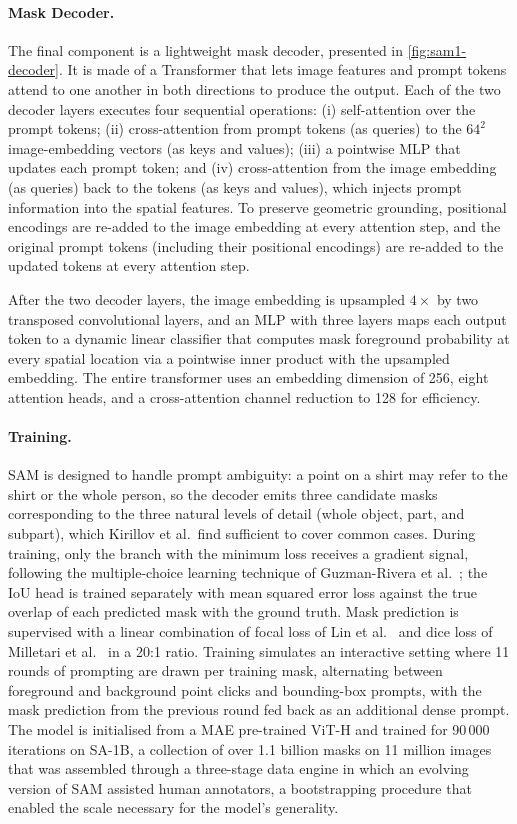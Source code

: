 \paragraph{Mask Decoder.} The final component is a lightweight mask decoder, presented in \cref{fig:sam1-decoder}. It is made of a Transformer that lets image features and prompt tokens attend to one another in both directions to produce the output. Each of the two decoder layers executes four sequential operations: (i) self-attention over the prompt tokens; (ii) cross-attention from prompt tokens (as queries) to the $64^2$ image-embedding vectors (as keys and values); (iii) a pointwise MLP that updates each prompt token; and (iv) cross-attention from the image embedding (as queries) back to the tokens (as keys and values), which injects prompt information into the spatial features. To preserve geometric grounding, positional encodings are re-added to the image embedding at every attention step, and the original prompt tokens (including their positional encodings) are re-added to the updated tokens at every attention step.

After the two decoder layers, the image embedding is upsampled $4\!\times$ by two transposed convolutional layers, and an MLP with three layers maps each output token to a dynamic linear classifier that computes mask foreground probability at every spatial location via a pointwise inner product with the upsampled embedding. The entire transformer uses an embedding dimension of 256, eight attention heads, and a cross-attention channel reduction to 128 for efficiency.

\paragraph{Training.} SAM is designed to handle prompt ambiguity: a point on a shirt may refer to the shirt or the whole person, so the decoder emits three candidate masks corresponding to the three natural levels of detail (whole object, part, and subpart), which Kirillov et al.\ find sufficient to cover common cases. During training, only the branch with the minimum loss receives a gradient signal, following the multiple-choice learning technique of Guzman-Rivera et al.\ \cite{NIPS2012_cfbce4c1}; the IoU head is trained separately with mean squared error loss against the true overlap of each predicted mask with the ground truth. Mask prediction is supervised with a linear combination of focal loss of Lin et al.\ \cite{lin2018focallossdenseobject} and dice loss of Milletari et al.\ \cite{milletari2016vnetfullyconvolutionalneural} in a 20:1 ratio. Training simulates an interactive setting where 11 rounds of prompting are drawn per training mask, alternating between foreground and background point clicks and bounding-box prompts, with the mask prediction from the previous round fed back as an additional dense prompt. The model is initialised from a MAE pre-trained ViT-H and trained for 90\,000 iterations on SA-1B, a collection of over 1.1 billion masks on 11 million images that was assembled through a three-stage data engine in which an evolving version of SAM assisted human annotators, a bootstrapping procedure that enabled the scale necessary for the model's generality.


